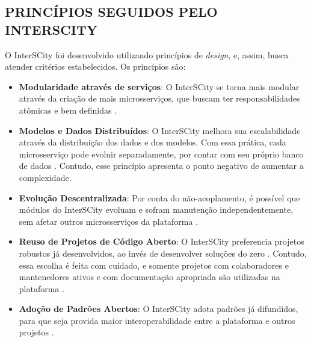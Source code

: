 \begin{apendicesenv}
    \partapendices

    \chapter{PRINCÍPIOS SEGUIDOS PELO INTERSCITY}
    \label{appendix:principles}

    O InterSCity foi desenvolvido utilizando princípios de \textit{design}, e,
    assim, busca atender critérios estabelecidos. Os princípios são:

    \begin{itemize}
        \item \textbf{Modularidade através de serviços}: O InterSCity se torna mais
            modular através da criação de mais microsserviços, que buscam ter
            responsabilidades atômicas e bem definidas \cite{delesposte2017}.

        \item \textbf{Modelos e Dados Distribuídos}: O InterSCity melhora sua
            escalabilidade através da distribuição dos dados e dos modelos. Com essa
            prática, cada microsserviço pode evoluir separadamente, por contar com seu
            próprio banco de dados \cite{delesposte2017}. Contudo, esse princípio apresenta
            o ponto negativo de aumentar a complexidade.

        \item \textbf{Evolução Descentralizada}: Por conta do não-acoplamento, é
            possível que módulos do InterSCity evoluam e sofram manutenção
            independentemente, sem afetar outros microsserviços da plataforma
            \cite{delesposte2017}.

        \item \textbf{Reuso de Projetos de Código Aberto}: O InterSCity preferencia %
            projetos robustos já desenvolvidos, ao invés de desenvolver soluções do zero
            \cite{delesposte2017}. Contudo, essa escolha é feita com cuidado, e somente
            projetos com colaboradores e mantenedores ativos e com documentação
            apropriada são utilizadas na plataforma \cite{delesposte2017}.

        \item \textbf{Adoção de Padrões Abertos}: O InterSCity adota padrões já
            difundidos, para que seja provida maior interoperabilidade entre a plataforma
            e outros projetos \cite{delesposte2017}.


\end{itemize}
\end{apendicesenv}

